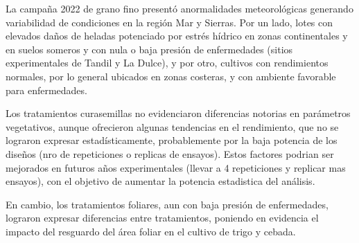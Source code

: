 \documentclass[
  letterpaper,
  DIV=11,
  numbers=noendperiod]{scrreprt}
\begin{document}
La campaña 2022 de grano fino presentó anormalidades meteorológicas
generando variabilidad de condiciones en la región Mar y Sierras. Por un
lado, lotes con elevados daños de heladas potenciado por estrés hídrico
en zonas continentales y en suelos someros y con nula o baja presión de
enfermedades (sitios experimentales de Tandil y La Dulce), y por otro,
cultivos con rendimientos normales, por lo general ubicados en zonas
costeras, y con ambiente favorable para enfermedades.

Los tratamientos curasemillas no evidenciaron diferencias notorias en
parámetros vegetativos, aunque ofrecieron algunas tendencias en el
rendimiento, que no se lograron expresar estadísticamente, probablemente
por la baja potencia de los diseños (nro de repeticiones o replicas de
ensayos). Estos factores podrian ser mejorados en futuros años
experimentales (llevar a 4 repeticiones y replicar mas ensayos), con el
objetivo de aumentar la potencia estadistica del análisis.

En cambio, los tratamientos foliares, aun con baja presión de
enfermedades, lograron expresar diferencias entre tratamientos, poniendo
en evidencia el impacto del resguardo del área foliar en el cultivo de
trigo y cebada.
\end{document}
